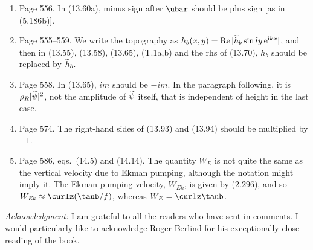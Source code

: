 \documentclass[10pt]{article}
\begin{document}
\begin{enumerate}

\item Page 556. In  (13.60a), minus sign after $\ubar$ should be plus sign [as in (5.186b)].

\item Page 555--559. We write the topography as $h_b(x,y)= \text{Re}\, [ \widetilde{h}_b \sin ly \, \mathrm{e}^{\mathrm{i} kx} ]$, and then in (13.55), (13.58), (13.65), (T.1a,b) and the rhs of (13.70), $h_b$ should be replaced by $\widetilde h_b$.

\item Page 558. In (13.65), $im$ should be $-im$. In the paragraph following,
   it is $\rho_R |\widetilde \psi|^2$, not the amplitude of $\widetilde \psi$ itself, that is independent of height in the last case. 

\item Page 574. The right-hand sides of (13.93) and (13.94) should be multiplied by $-1$.

\item Page 586, eqs.\ (14.5) and (14.14). The quantity $W_E$ is not quite the same as the vertical velocity due to Ekman pumping, although the notation might imply it. The Ekman pumping velocity, $W_{\textit{Ek}}$, is given by (2.296), and so $W_{\textit{Ek}} \approx \curlz (\taub/f)$, whereas $W_E = \curlz \taub$.  
 


\end{enumerate}

\noindent \textit{Acknowledgment:} I am grateful to all the readers who have sent in comments. I would particularly like to acknowledge Roger Berlind for his exceptionally close reading of the book.
\end{document}
